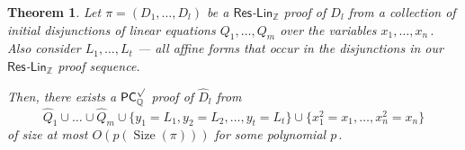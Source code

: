\documentclass[11pt]{article}
\newtheorem{theorem}{Theorem}[section]
\newcommand{\Q}{{\mathbb Q}}
\newcommand{\Z}{{\mathbb Z}}
\DeclareMathOperator{\Size}{\mathrm{Size}}
\begin{document}
\begin{theorem}
\label{Res-Lin-b simulation}
%
Let $\pi = (D_1, \ldots, D_l)$ be a $\mathsf{Res}$-$\mathsf{Lin}_{\Z}$ proof  of $D_l$ from a collection of initial disjunctions of linear equations $Q_1, \ldots, Q_m$ over the variables %
$x_1, \ldots, x_n\,.$ %
 Also consider $L_1, \ldots, L_t$ --- all affine forms that occur in the disjunctions in our $\mathsf{Res}$-$\mathsf{Lin}_\Z$ proof sequence. %

Then, there exists a $\mathsf{PC}_{\Q}^{\surd}$ proof of $\widehat{D}_l$ from 
$$
\widehat{Q}_1 \cup \ldots \cup \widehat{Q}_m \cup \{y_1 = L_1, y_2 = L_2, \ldots, y_t = L_t\} \cup \{x_1^2 = x_1, \ldots, x_n^2 = x_n\}
$$ 
of size at most $O(p(\Size(\pi)))$ for some polynomial %
$p\,.$ %
\end{theorem}
\end{document}
